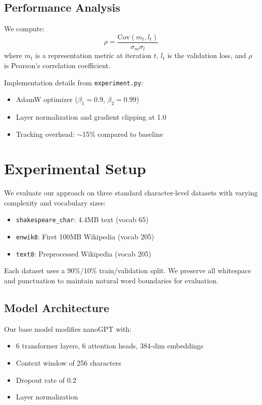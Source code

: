 \documentclass{article} %
\begin{document}
\subsection{Performance Analysis}
We compute:
\begin{equation}
    \rho = \frac{\text{Cov}(m_t, l_t)}{\sigma_m\sigma_l}
\end{equation}
where $m_t$ is a representation metric at iteration $t$, $l_t$ is the validation loss, and $\rho$ is Pearson's correlation coefficient.

Implementation details from \texttt{experiment.py}:
\begin{itemize}
    \item AdamW optimizer ($\beta_1=0.9$, $\beta_2=0.99$)
    \item Layer normalization and gradient clipping at 1.0
    \item Tracking overhead: $\sim$15\% compared to baseline
\end{itemize}

\section{Experimental Setup}
\label{sec:experimental}

We evaluate our approach on three standard character-level datasets with varying complexity and vocabulary sizes:

\begin{itemize}
    \item \texttt{shakespeare\_char}: 4.4MB text (vocab 65)
    \item \texttt{enwik8}: First 100MB Wikipedia (vocab 205) 
    \item \texttt{text8}: Preprocessed Wikipedia (vocab 205)
\end{itemize}

Each dataset uses a 90\%/10\% train/validation split. We preserve all whitespace and punctuation to maintain natural word boundaries for evaluation.

\subsection{Model Architecture}
Our base model modifies nanoGPT \citep{karpathy2023nanogpt} with:
\begin{itemize}
    \item 6 transformer layers, 6 attention heads, 384-dim embeddings
    \item Context window of 256 characters
    \item Dropout rate of 0.2
    \item Layer normalization \citep{ba2016layer}
\end{itemize}
\end{document}
